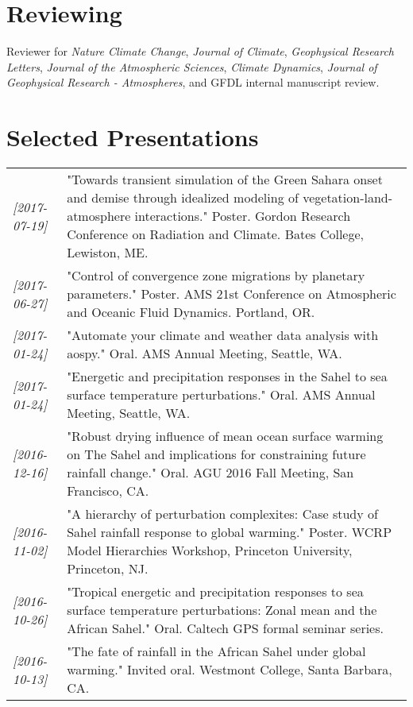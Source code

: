 \documentclass[12pt,letterpaper]{shillcv}
\begin{document}
\section*{Reviewing}
\label{sec:orga59b0ff}
Reviewer for \emph{Nature Climate Change}, \emph{Journal of Climate}, \emph{Geophysical Research
Letters}, \emph{Journal of the Atmospheric Sciences}, \emph{Climate Dynamics}, \emph{Journal of
Geophysical Research - Atmospheres}, and GFDL internal manuscript review.
\section*{Selected Presentations}
\label{sec:orga027d85}
\begin{center}
\begin{tabularx}{\textwidth}{lX}
\textit{[2017-07-19]} & "Towards transient simulation of the Green Sahara onset and demise through idealized modeling of vegetation-land-atmosphere interactions."  Poster.  Gordon Research Conference on Radiation and Climate.  Bates College, Lewiston, ME.\\
\textit{[2017-06-27]} & "Control of convergence zone migrations by planetary parameters."  Poster.  AMS 21st Conference on Atmospheric and Oceanic Fluid Dynamics.  Portland, OR.\\
\textit{[2017-01-24]} & "Automate your climate and weather data analysis with aospy."  Oral.  AMS Annual Meeting, Seattle, WA.\\
\textit{[2017-01-24]} & "Energetic and precipitation responses in the Sahel to sea surface temperature perturbations."  Oral.  AMS Annual Meeting, Seattle, WA.\\
\textit{[2016-12-16]} & "Robust drying influence of mean ocean surface warming on The Sahel and implications for constraining future rainfall change."  Oral.  AGU 2016 Fall Meeting, San Francisco, CA.\\
\textit{[2016-11-02]} & "A hierarchy of perturbation complexites: Case study of Sahel rainfall response to global warming."  Poster.  WCRP Model Hierarchies Workshop, Princeton University, Princeton, NJ.\\
\textit{[2016-10-26]} & "Tropical energetic and precipitation responses to sea surface temperature perturbations: Zonal mean and the African Sahel."  Oral.  Caltech GPS formal seminar series.\\
\textit{[2016-10-13]} & "The fate of rainfall in the African Sahel under global warming."  Invited oral.  Westmont College, Santa Barbara, CA.\\

\end{tabularx}
\end{center}
\end{document}
